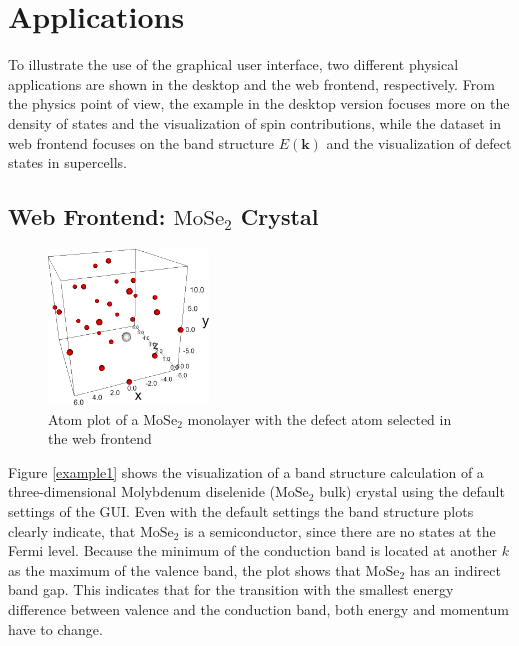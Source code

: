 \chapter{Applications}
\label{chap:applications}


To illustrate the use of the graphical user interface, two different physical
applications are shown in the desktop and the web frontend, respectively. From
the physics point of view, the example in the desktop version focuses more on the
density of states and the visualization of spin contributions, while the dataset
in web frontend focuses on the band structure $E(\mathbf{k})$ and the visualization
of defect states in supercells.

\section{Web Frontend: $\textrm{MoSe}_2$ Crystal}

\begin{figure} %
    \centering
    \includegraphics[width=0.38\textwidth]{img/gui_web_mose2_monolayer_atomplot.png}
    \caption[Atom Plot of a $\textrm{MoSe}_2$ monolayer]{Atom plot of a $\textrm{MoSe}_2$ monolayer with the defect atom selected in
      the web frontend}
    \label{fig:modules}
\end{figure}

Figure \ref{example1} shows the visualization of a band structure calculation of a three-dimensional Molybdenum diselenide ($\textrm{MoSe}_2$ bulk) crystal using the default settings of the GUI. Even with the default settings the band structure plots clearly indicate, that $\textrm{MoSe}_2$ is a semiconductor, since there are no states at the Fermi level. Because the minimum of the conduction band is located at another $k$ as the maximum of the valence band, the plot shows that $\textrm{MoSe}_2$ has an indirect band gap. This indicates that for the transition with the smallest energy difference between valence and the conduction band, both energy and momentum have to change.

